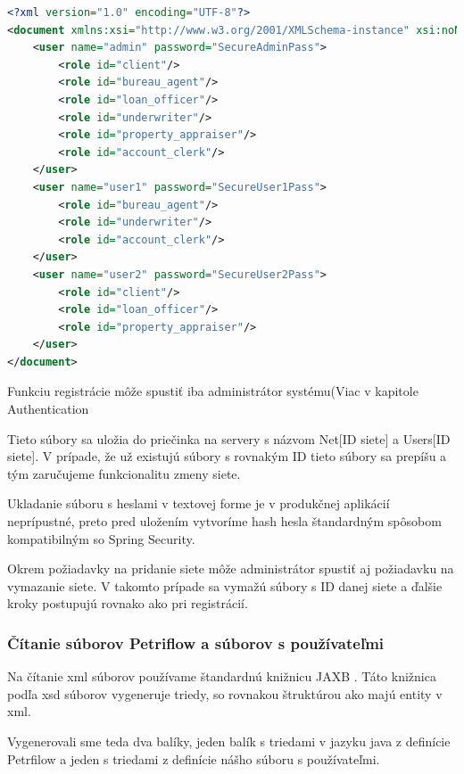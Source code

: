 

\begin{lstlisting}[float, caption={Príklad súboru s používateľmi},label={alg:example_users},language=XML] 
<?xml version="1.0" encoding="UTF-8"?> 
<document xmlns:xsi="http://www.w3.org/2001/XMLSchema-instance" xsi:noNamespaceSchemaLocation="./users_schema.xsd"> 
	<user name="admin" password="SecureAdminPass"> 
		<role id="client"/> 
		<role id="bureau_agent"/> 
		<role id="loan_officer"/> 
		<role id="underwriter"/> 
		<role id="property_appraiser"/> 
		<role id="account_clerk"/> 
	</user> 
	<user name="user1" password="SecureUser1Pass"> 
		<role id="bureau_agent"/> 
		<role id="underwriter"/> 
		<role id="account_clerk"/> 
	</user> 
	<user name="user2" password="SecureUser2Pass"> 
		<role id="client"/> 
		<role id="loan_officer"/> 
		<role id="property_appraiser"/> 
	</user> 
</document> 
\end{lstlisting} 

Funkciu registrácie môže spustiť iba administrátor systému(Viac v kapitole Authentication %

Tieto súbory sa uložia do priečinka na servery s názvom Net[ID siete] a Users[ID siete]. V prípade, že už existujú súbory s rovnakým ID tieto súbory sa prepíšu a tým zaručujeme funkcionalitu zmeny siete.  

Ukladanie súboru s heslami v textovej forme je v produkčnej aplikácií neprípustné, preto pred uložením vytvoríme hash hesla štandardným spôsobom kompatibilným so Spring Security. 



Okrem požiadavky na pridanie siete môže administrátor spustiť aj požiadavku na vymazanie siete. V takomto prípade sa vymažú súbory s ID danej siete a ďalšie kroky postupujú rovnako ako pri registrácií. 





\subsubsection{Čítanie súborov Petriflow a súborov s používateľmi} 
Na čítanie \acrshort{xml} súborov používame štandardnú knižnicu JAXB \cite{jaxb}. Táto knižnica podľa \acrshort{xsd} súborov vygeneruje triedy, so rovnakou štruktúrou ako majú entity v \acrshort{xml}. 

Vygenerovali sme teda dva balíky, jeden balík s triedami v jazyku java z definície Petrfilow a jeden s triedami z definície nášho súboru s používateľmi.  

